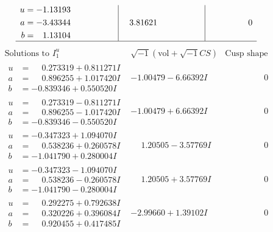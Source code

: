 \documentclass[1p]{elsarticle_modified}
\theoremstyle{definition}
\newcommand{\I}{\sqrt{-1}}
\begin{document}
$$\begin{array}{c|c|c}
\begin{aligned}
u &= -1.13193\phantom{ +0.000000I} \\
a &= -3.43344\phantom{ +0.000000I} \\
b &= \phantom{-}1.13104\phantom{ +0.000000I}\end{aligned}
 & \phantom{-}3.81621\phantom{ +0.000000I} & \phantom{-0.000000 } 0\\
 \hline 
 \end{array}$$\newpage$$\begin{array}{c|c|c}  
\text{Solutions to }I^u_{1}& \I (\text{vol} + \sqrt{-1}CS) & \text{Cusp shape}\\
 \hline 
\begin{aligned}
u &= \phantom{-}0.273319 + 0.811271 I \\
a &= \phantom{-}0.896255 + 1.017420 I \\
b &= -0.839346 + 0.550520 I\end{aligned}
 & -1.00479 - 6.66392 I & \phantom{-0.000000 } 0 \\ \hline\begin{aligned}
u &= \phantom{-}0.273319 - 0.811271 I \\
a &= \phantom{-}0.896255 - 1.017420 I \\
b &= -0.839346 - 0.550520 I\end{aligned}
 & -1.00479 + 6.66392 I & \phantom{-0.000000 } 0 \\ \hline\begin{aligned}
u &= -0.347323 + 1.094070 I \\
a &= \phantom{-}0.538236 + 0.260578 I \\
b &= -1.041790 + 0.280004 I\end{aligned}
 & \phantom{-}1.20505 - 3.57769 I & \phantom{-0.000000 } 0 \\ \hline\begin{aligned}
u &= -0.347323 - 1.094070 I \\
a &= \phantom{-}0.538236 - 0.260578 I \\
b &= -1.041790 - 0.280004 I\end{aligned}
 & \phantom{-}1.20505 + 3.57769 I & \phantom{-0.000000 } 0 \\ \hline\begin{aligned}
u &= \phantom{-}0.292275 + 0.792638 I \\
a &= \phantom{-}0.320226 + 0.396084 I \\
b &= \phantom{-}0.920455 + 0.417485 I\end{aligned}
 & -2.99660 + 1.39102 I & \phantom{-0.000000 } 0 \\ \hline\begin{aligned}

\end{aligned}
\end{array}$$
\end{document}
